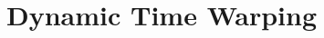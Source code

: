 

\section{Dynamic Time Warping} %
\label{sec:dynamic_time_warping}
\newcommand{\ttt}{\mathcal T}
\newcommand{\auto}{R}
\newcommand{\Auto}{\boldsymbol R}

